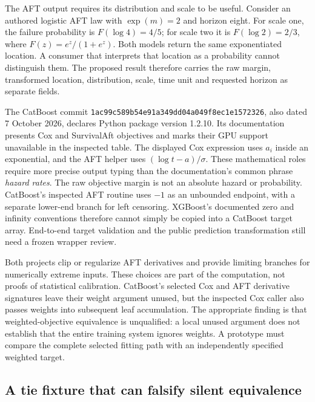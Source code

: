 The AFT output requires its distribution and scale to be useful. Consider an
authored logistic AFT law with $\exp(m)=2$ and horizon eight. For scale one,
the failure probability is $F(\log 4)=4/5$; for scale two it is
$F(\log 2)=2/3$, where $F(z)=e^z/(1+e^z)$. Both models return the same
exponentiated location. A consumer that interprets that location as a probability
cannot distinguish them. The proposed result therefore carries the raw margin,
transformed location, distribution, scale, time unit and requested horizon as
separate fields.\citep{exec24_longcxx_reference}

The CatBoost commit
\texttt{1ac99c589b54e91a349dd04a049f8ec1e1572326}, also dated 7 October
2026, declares Python package version 1.2.10. Its documentation presents Cox
and SurvivalAft objectives and marks their GPU support unavailable in the
inspected table. The displayed Cox expression uses $a_i$ inside an exponential,
and the AFT helper uses $(\log t-a)/\sigma$. These mathematical roles require
more precise output typing than the documentation's common phrase \emph{hazard
rates}. The raw objective margin is not an absolute hazard or probability.
CatBoost's inspected AFT routine uses $-1$ as an unbounded endpoint, with a
separate lower-end branch for left censoring. XGBoost's documented zero and
infinity conventions therefore cannot simply be copied into a CatBoost target
array. End-to-end target validation and the public prediction transformation
still need a frozen wrapper review.\citep{exec24_longcxx_catboost}

Both projects clip or regularize AFT derivatives and provide limiting branches
for numerically extreme inputs. These choices are part of the computation,
not proofs of statistical calibration. CatBoost's selected Cox and AFT derivative
signatures leave their weight argument unused, but the inspected Cox caller
also passes weights into subsequent leaf accumulation. The appropriate finding
is that weighted-objective equivalence is unqualified: a local unused argument
does not establish that the entire training system ignores weights. A prototype
must compare the complete selected fitting path with an independently specified
weighted target.\citep{exec24_longcxx_xgboost,exec24_longcxx_catboost}

\subsection{A tie fixture that can falsify silent equivalence}

